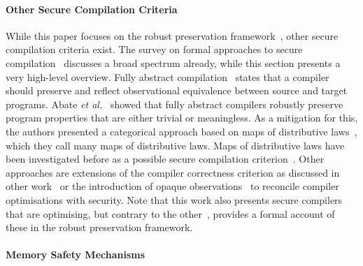 \documentclass[dvipsnames,conference]{IEEEtran}
\theoremstyle{definition}
\begin{document}
\paragraph*{Other Secure Compilation Criteria}\label{subsec:relw:seccompcrit}

While this paper focuses on the robust preservation framework~\cite{abate2019jour}, other secure compilation criteria exist.
The survey on formal approaches to secure compilation~\cite{patrignani2019survey} discusses a broad spectrum already, while this section presents a very high-level overview.
Fully abstract compilation~\cite{abadi1999fullabstraction} states that a compiler should preserve and reflect observational equivalence between source and target programs.
Abate \emph{et al.}~\cite{abate2021faandrc} showed that fully abstract compilers robustly preserve program properties that are either trivial or meaningless.
As a mitigation for this, the authors presented a categorical approach based on maps of distributive laws~\cite{watanabe2002modl}, which they call many maps of distributive laws.
Maps of distributive laws have been investigated before as a possible secure compilation criterion~\cite{tsampas2020catsc}.
Other approaches are extensions of the compiler correctness criterion as discussed in other work~\cite{patterson2019next700} or the introduction of opaque observations~\cite{vu2021reconciling} to reconcile compiler optimisations with security.
Note that this work also presents secure compilers that are optimising, but contrary to the other~\cite{vu2021reconciling}, provides a formal account of these in the robust preservation framework.

\paragraph*{Memory Safety Mechanisms}\label{subsec:relw:msmechs}
\end{document}
